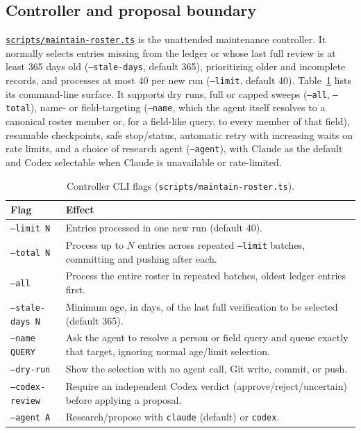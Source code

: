 \documentclass[11pt]{article}
\newcommand{\code}[1]{\texttt{\small #1}}
\newcommand{\ghrepo}{https://github.com/dynaroars/vietprofs}
\newcommand{\codelink}[1]{\href{\ghrepo/blob/main/#1}{\code{#1}}}
\begin{document}
\subsection{Controller and proposal boundary}
\codelink{scripts/maintain-roster.ts} is the unattended maintenance controller.
It normally selects entries missing from the ledger or whose last full review is at least 365 days old (\code{--stale-days}, default 365), prioritizing older and incomplete records, and processes at most 40 per new run (\code{--limit}, default 40).
Table~\ref{tab:cli} lists its command-line surface.
It supports dry runs, full or capped sweeps (\code{--all}, \code{--total}), name- or field-targeting (\code{--name}, which the agent itself resolves to a canonical roster member or, for a field-like query, to every member of that field), resumable checkpoints, safe stop/status, automatic retry with increasing waits on rate limits, and a choice of research agent (\code{--agent}), with Claude as the default and Codex selectable when Claude is unavailable or rate-limited.

\begin{table}[t]
\centering
\caption{Controller CLI flags (\code{scripts/maintain-roster.ts}).}
\label{tab:cli}
\small
\begin{tabularx}{\linewidth}{@{}lX@{}}
\toprule
Flag & Effect \\
\midrule
\code{--limit N} & Entries processed in one new run (default 40). \\
\code{--total N} & Process up to $N$ entries across repeated \code{--limit} batches, committing and
pushing after each. \\
\code{--all} & Process the entire roster in repeated batches, oldest ledger entries first. \\
\code{--stale-days N} & Minimum age, in days, of the last full verification to be selected (default
365). \\
\code{--name QUERY} & Ask the agent to resolve a person or field query and queue exactly that target,
ignoring normal age/limit selection. \\
\code{--dry-run} & Show the selection with no agent call, Git write, commit, or push. \\
\code{--codex-review} & Require an independent Codex verdict (approve/reject/uncertain) before
applying a proposal. \\
\code{--agent A} & Research/propose with \code{claude} (default) or \code{codex}. \\
\bottomrule
\end{tabularx}
\end{table}
\end{document}
